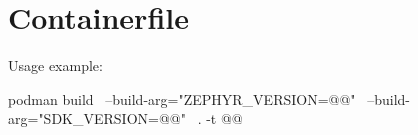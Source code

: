 

\newpage
\fancyfoot{}

\section{Containerfile}\label{containerfile}



Usage example:

\begin{monobox}
podman build \
  --build-arg="ZEPHYR_VERSION=@\zephyrversion{}@" \
  --build-arg="SDK_VERSION=@\sdkversion{}@" \
  . -t @\imagename{}@
\end{monobox}



